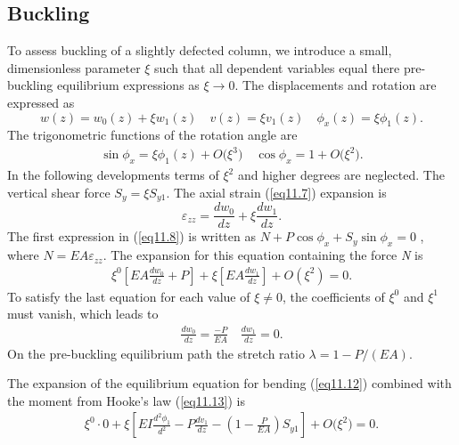 \documentclass{AeroStructure-ERJohnson}
\begin{document}
\subsection{Buckling}\label{sec11.1.2}

To assess buckling of a slightly defected column, we introduce a small, dimensionless parameter $ \xi $ such that all dependent variables equal there pre-buckling equilibrium expressions as $ \xi \rightarrow 0 $. The displacements and rotation are expressed as
\begin{equation}
w(z)=w_{0}(z)+\xi w_{1}(z) \quad v(z)=\xi v_{1}(z) \quad \phi_{x}(z)=\xi \phi_{1}(z). \label{eq11.15}
\end{equation}
The trigonometric functions of the rotation angle are
\begin{align}
\sin \phi_{x}=\xi \phi_{1}(z)+O\big(\xi^{3}\big) \quad \cos \phi_{x}=1+O\big(\xi^{2}\big).\label{eq11.16}
\end{align}
In the following developments terms of $ \xi^{2} $ and higher degrees are neglected. The vertical shear force $ S_{y}=\xi S_{y 1} $. The axial strain (\ref{eq11.7}) expansion is
\begin{equation}
\varepsilon_{zz}=\frac{d w_{0}}{d z}+\xi \frac{d w_{1}}{d z}. \label{eq11.17}
\end{equation}
The first expression in (\ref{eq11.8}) is written as $ N+P \cos \phi_{x}+S_{y} \sin \phi_{x}=0 $ , where $ N=E A \varepsilon_{z z} $. The expansion for this equation containing the force \textit{N} is
\begin{align}
\xi^{0}\left[E A \frac{d w_{0}}{d z}+P\right]+\xi\left[E A \frac{d w_{1}}{d z}\right]+O(\xi^{2})=0.\label{eq11.18}
\end{align}
To satisfy the last equation for each value of $ \xi \neq 0 $, the coefficients of $ \xi^{0} $ and $ \xi^{1} $ must vanish, which leads to
\begin{align}
\frac{d w_{0}}{d z}=\frac{-P}{E A} \quad \frac{d w_{1}}{d z}=0. \label{eq11.19}
\end{align}
On the pre-buckling equilibrium path the stretch ratio $ \lambda=1-P /(E A) $.

The expansion of the equilibrium equation for bending (\ref{eq11.12}) combined with the moment from Hooke's law (\ref{eq11.13}) is
\begin{align}
\xi^{0} \cdot 0+\xi\left[E I \frac{d^{2} \phi_{1}}{d^{2}}-P \frac{d v_{1}}{d z}-\left(1-\frac{P}{E A}\right) S_{y 1}\right]+O\big(\xi^{2}\big)=0. \label{eq11.20}
\end{align}
\vspace*{5pt}
\clearpage
\end{document}
